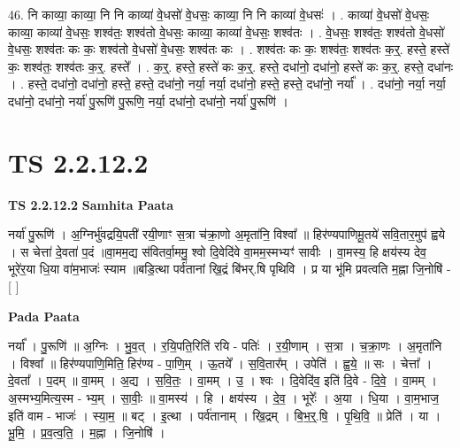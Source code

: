 \documentclass[17pt]{extarticle}
\begin{document}
46. नि काव्या॒ काव्या॒ नि नि काव्या॑ वे॒धसो॑ वे॒धसः॒ काव्या॒ नि नि काव्या॑ वे॒धसः॑ । . काव्या॑ वे॒धसो॑ वे॒धसः॒ काव्या॒ काव्या॑ वे॒धसः॒ शश्व॑तः॒ शश्व॑तो वे॒धसः॒ काव्या॒ काव्या॑ वे॒धसः॒ शश्व॑तः । . वे॒धसः॒ शश्व॑तः॒ शश्व॑तो वे॒धसो॑ वे॒धसः॒ शश्व॑तः कः कः॒ शश्व॑तो वे॒धसो॑ वे॒धसः॒ शश्व॑तः कः । . शश्व॑तः कः कः॒ शश्व॑तः॒ शश्व॑तः क॒र्॒. हस्ते॒ हस्ते॑ कः॒ शश्व॑तः॒ शश्व॑तः क॒र्॒. हस्ते᳚ । . क॒र्॒. हस्ते॒ हस्ते॑ कः क॒र्॒. हस्ते॒ दधा॑नो॒ दधा॑नो॒ हस्ते॑ कः क॒र्॒. हस्ते॒ दधा॑नः । . हस्ते॒ दधा॑नो॒ दधा॑नो॒ हस्ते॒ हस्ते॒ दधा॑नो॒ नर्या॒ नर्या॒ दधा॑नो॒ हस्ते॒ हस्ते॒ दधा॑नो॒ नर्या᳚ । . दधा॑नो॒ नर्या॒ नर्या॒ दधा॑नो॒ दधा॑नो॒ नर्या॑ पु॒रूणि॑ पु॒रूणि॒ नर्या॒ दधा॑नो॒ दधा॑नो॒ नर्या॑ पु॒रूणि॑ । \newline
\pagebreak
{}

\section{ TS 2.2.12.2 }

\textbf{TS 2.2.12.2 } \newline
\textbf{Samhita Paata} \newline

नर्या॑ पु॒रूणि॑ । अ॒ग्निर्भु॑वद्रयि॒पती॑ रयी॒णाꣳ स॒त्रा च॑क्रा॒णो अ॒मृता॑नि॒ विश्वा᳚ ॥ हिर॑ण्यपाणिमू॒तये॑ सवि॒तार॒मुप॑ ह्वये । स चेत्ता॑ दे॒वता॑ प॒दं ॥वा॒मम॒द्य स॑वितर्वा॒ममु॒ श्वो दि॒वेदि॑वे वा॒मम॒स्मभ्यꣳ॑ सावीः । वा॒मस्य॒ हि क्षय॑स्य देव॒ भूरे॑र॒या धि॒या वा॑म॒भाजः॑ स्याम ॥बडि॒त्था पर्व॑तानां खि॒द्रं बि॑भर्.षि पृथिवि । प्र या भू॑मि प्रवत्वति म॒ह्ना जि॒नोषि॑ - [  ] \newline

\textbf{Pada Paata} \newline

नर्या᳚ । पु॒रूणि॑ ॥ अ॒ग्निः । भु॒व॒त् । र॒यि॒पति॒रिति॑ रयि - पतिः॑ । र॒यी॒णाम् । स॒त्रा । च॒क्रा॒णः । अ॒मृता॑नि । विश्वा᳚ ॥ हिर॑ण्यपाणि॒मिति॒ हिर॑ण्य - पा॒णि॒म् । ऊ॒तये᳚ । स॒वि॒तार᳚म् । उपेति॑ । ह्व॒ये॒ ॥ सः । चेत्ता᳚ । दे॒वता᳚ । प॒दम् ॥ वा॒मम् । अ॒द्य । स॒वि॒तः॒ । वा॒मम् । उ॒ । श्वः । दि॒वेदि॑व॒ इति॑ दि॒वे - दि॒वे॒ । वा॒मम् । अ॒स्मभ्य॒मित्य॒स्म - भ्य॒म् । सा॒वीः॒ ॥ वा॒मस्य॑ । हि । क्षय॑स्य । दे॒व॒ । भूरेः᳚ । अ॒या । धि॒या । वा॒म॒भाज॒ इति॑ वाम - भाजः॑ । स्या॒म॒ ॥ बट् । इ॒त्था । पर्व॑तानाम् । खि॒द्रम् । बि॒भ॒र्॒.षि॒ । पृ॒थि॒वि॒ ॥ प्रेति॑ । या । भू॒मि॒ । प्र॒व॒त्व॒ति॒ । म॒ह्ना । जि॒नोषि॑ ।  \newline
\end{document}
